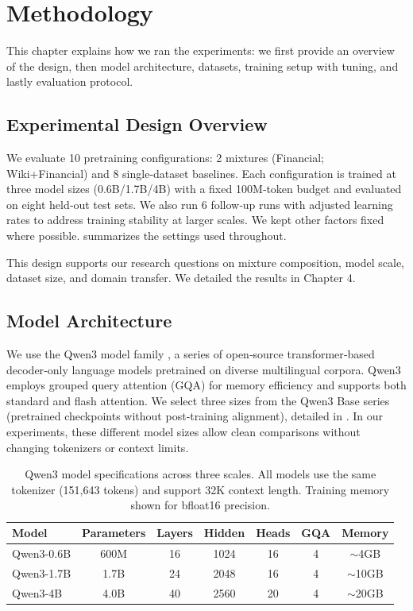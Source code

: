 \chapter{Methodology}

This chapter explains how we ran the experiments: we first provide an overview of the design, then model architecture, datasets, training setup with tuning, and lastly evaluation protocol.

\section{Experimental Design Overview}

We evaluate 10 pretraining configurations: 2 mixtures (Financial; Wiki+Financial) and 8 single‑dataset baselines. Each configuration is trained at three model sizes (0.6B/1.7B/4B) with a fixed 100M‑token budget and evaluated on eight held‑out test sets. We also run 6 follow‑up runs with adjusted learning rates to address training stability at larger scales. We kept other factors fixed where possible.  summarizes the settings used throughout.



This design supports our research questions on mixture composition, model scale, dataset size, and domain transfer. We detailed the results in Chapter 4.

\section{Model Architecture}

We use the Qwen3 model family \parencite{yang2024qwen2,qwen3}, a series of open‑source transformer‑based decoder‑only language models pretrained on diverse multilingual corpora. Qwen3 employs grouped query attention (GQA) for memory efficiency and supports both standard and flash attention. We select three sizes from the Qwen3 Base series (pretrained checkpoints without post‑training alignment), detailed in . In our experiments, these different model sizes allow clean comparisons without changing tokenizers or context limits.

\begin{table}[htbp]
\centering
\caption[Qwen3 Model Specifications]{Qwen3 model specifications across three scales. All models use the same tokenizer (151,643 tokens) and support 32K context length. Training memory shown for bfloat16 precision.}
\label{tab:model_specs}
\begin{tabular}{lcccccc}
\toprule
\textbf{Model} & \textbf{Parameters} & \textbf{Layers} & \textbf{Hidden} & \textbf{Heads} & \textbf{GQA} & \textbf{Memory} \\
\midrule
Qwen3-0.6B & 600M & 16 & 1024 & 16 & 4 & $\sim$4GB \\
Qwen3-1.7B & 1.7B & 24 & 2048 & 16 & 4 & $\sim$10GB \\
Qwen3-4B & 4.0B & 40 & 2560 & 20 & 4 & $\sim$20GB \\
\bottomrule
\end{tabular}
\end{table}

